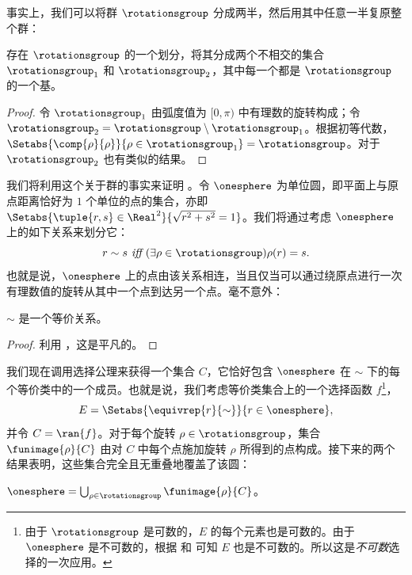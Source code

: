 \documentclass[../../../include/open-logic-section]{subfiles}
\begin{document}
事实上，我们可以将群 $\rotationsgroup$ 分成两半，然后用其中任意一半复原整个群：


\begin{lem}
存在 $\rotationsgroup$ 的一个划分，将其分成两个不相交的集合 $\rotationsgroup_{1}$ 和 $\rotationsgroup_{2}$，其中每一个都是 $\rotationsgroup$ 的一个基。
\end{lem}

\begin{proof}
令 $\rotationsgroup_{1}$ 由弧度值为 $[0, \pi)$ 中有理数的旋转构成；令 $\rotationsgroup_{2} = \rotationsgroup
\setminus \rotationsgroup_1$。根据初等代数，$\Setabs{\comp{\rho}{\rho}}{\rho \in \rotationsgroup_1} =
\rotationsgroup$。对于 $\rotationsgroup_2$ 也有类似的结果。
\end{proof}


我们将利用这个关于群的事实来证明 。令 $\onesphere$ 为单位圆，即平面上与原点距离恰好为 $1$ 个单位的点的集合，亦即 $\Setabs{\tuple{r,s} \in \Real^2}{\sqrt{r^2+s^2}=1}$。我们将通过考虑 $\onesphere$ 上的如下关系来划分它：
\[
	r \sim s \emph{ iff }(\exists \rho \in \rotationsgroup)\rho(r) = s.
\]
也就是说，$\onesphere$ 上的点由该关系相连，当且仅当可以通过绕原点进行一次有理数值的旋转从其中一个点到达另一个点。毫不意外：


\begin{lem}
$\sim$ 是一个等价关系。
\end{lem}

\begin{proof}
利用 ，这是平凡的。
\end{proof}


我们现在调用选择公理来获得一个集合 $C$，它恰好包含 $\onesphere$ 在 $\sim$ 下的每个等价类中的一个成员。也就是说，我们考虑等价类集合上的一个选择函数 $f$\footnote{由于 $\rotationsgroup$ 是可数的，$E$ 的每个元素也是可数的。由于 $\onesphere$ 是不可数的，根据  和  可知 $E$ 也是不可数的。所以这是\emph{不可数}选择的一次应用。}，\[
	E = \Setabs{\equivrep{r}{\sim}}{r \in \onesphere},
\]
并令 $C = \ran{f}$。对于每个旋转 $\rho \in \rotationsgroup$，集合 $\funimage{\rho}{C}$ 由对 $C$ 中每个点施加旋转 $\rho$ 所得到的点构成。接下来的两个结果表明，这些集合完全且无重叠地覆盖了该圆：


\begin{lem}
$\onesphere = \bigcup_{\rho \in \rotationsgroup} \funimage{\rho}{C}$。
\end{lem}
\end{document}
